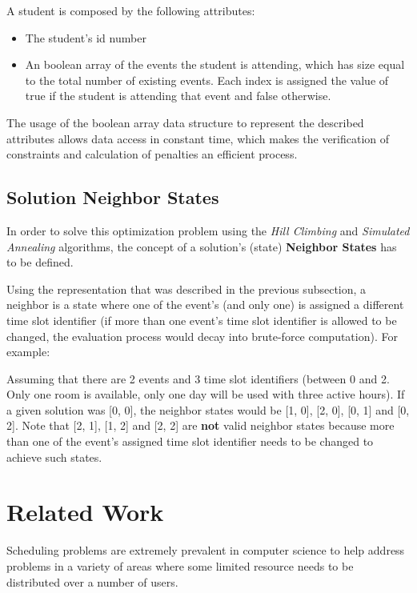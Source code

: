 \documentclass[conference]{IEEEtran}
\begin{document}
A student is composed by the following attributes:
\begin{itemize}
    \item The student's id number
    \item An boolean array of the events the student is attending, which has size equal to the total number of existing events. Each index is assigned the value of true if the student is attending that event and false otherwise.
\end{itemize}

The usage of the boolean array data structure to represent the described attributes allows data access in constant time, which makes the verification of constraints and calculation of penalties an efficient process.

\subsection{Solution Neighbor States} \label{subsec:sns}

In order to solve this optimization problem using the \textit{Hill Climbing} and \textit{Simulated Annealing} algorithms, the concept of a solution's (state) \textbf{Neighbor States} has to be defined.

Using the representation that was described in the previous subsection, a neighbor is a state where one of the event's (and only one) is assigned a different time slot identifier (if more than one event's time slot identifier is allowed to be changed, the evaluation process would decay into brute-force computation). For example:

Assuming that there are 2 events and 3 time slot identifiers (between 0 and 2. Only one room is available, only one day will be used with three active hours). If a given solution was [0, 0], the neighbor states would be [1, 0], [2, 0], [0, 1] and [0, 2]. Note that [2, 1], [1, 2] and [2, 2] are \textbf{not} valid neighbor states because more than one of the event's assigned time slot identifier needs to be changed to achieve such states.

\section{Related Work}

Scheduling problems are extremely prevalent in computer science to help address problems in a variety of areas where some limited resource needs to be distributed over a number of users.
\end{document}
